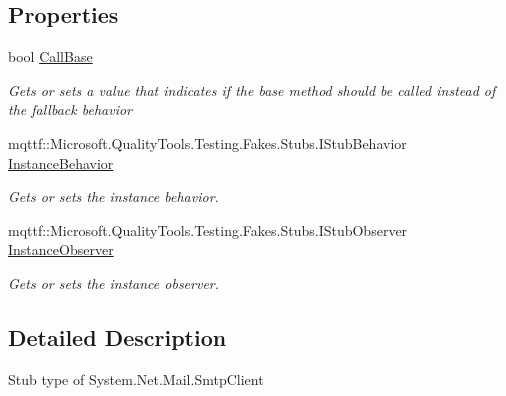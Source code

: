 \subsection*{Properties}
\begin{DoxyCompactItemize}
\item 
bool \hyperlink{class_system_1_1_net_1_1_mail_1_1_fakes_1_1_stub_smtp_client_a5f68a049d8a22e9fe23275ab8fa9b8a1}{Call\-Base}
\begin{DoxyCompactList}\small\item\em Gets or sets a value that indicates if the base method should be called instead of the fallback behavior\end{DoxyCompactList}\item 
mqttf\-::\-Microsoft.\-Quality\-Tools.\-Testing.\-Fakes.\-Stubs.\-I\-Stub\-Behavior \hyperlink{class_system_1_1_net_1_1_mail_1_1_fakes_1_1_stub_smtp_client_aaccd5f65ffbae6d9b3b0ec2c539a9d21}{Instance\-Behavior}
\begin{DoxyCompactList}\small\item\em Gets or sets the instance behavior.\end{DoxyCompactList}\item 
mqttf\-::\-Microsoft.\-Quality\-Tools.\-Testing.\-Fakes.\-Stubs.\-I\-Stub\-Observer \hyperlink{class_system_1_1_net_1_1_mail_1_1_fakes_1_1_stub_smtp_client_a0e669c0a3c094064b47971362ceb9c70}{Instance\-Observer}
\begin{DoxyCompactList}\small\item\em Gets or sets the instance observer.\end{DoxyCompactList}\end{DoxyCompactItemize}


\subsection{Detailed Description}
Stub type of System.\-Net.\-Mail.\-Smtp\-Client



